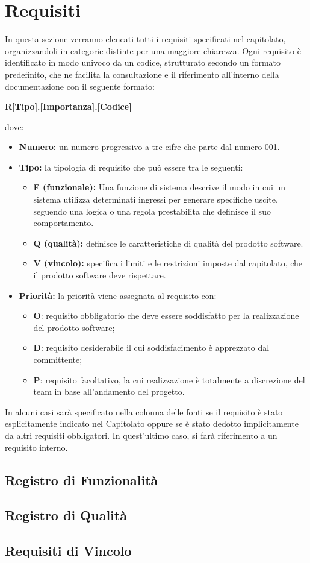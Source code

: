\section{Requisiti}
In questa sezione verranno elencati tutti i requisiti specificati nel capitolato, organizzandoli in categorie distinte per una maggiore chiarezza. Ogni requisito è identificato in modo univoco da un codice, strutturato secondo un formato predefinito, che ne facilita la consultazione e il riferimento all'interno della documentazione con il seguente formato: 
\begin{center}
\textbf{R[Tipo].[Importanza].[Codice]}
\end{center}
dove:
\begin{itemize}
    \item \textbf{Numero:} un numero progressivo a tre cifre che parte dal numero 001.
    \item \textbf{Tipo:} la tipologia di requisito che può essere tra le seguenti:
    \begin{itemize}[label=-]
        \item \textbf{F (funzionale):} Una funzione di sistema descrive il modo in cui un sistema utilizza determinati ingressi per generare specifiche uscite, seguendo una logica o una regola prestabilita che definisce il suo comportamento.
        \item \textbf{Q (qualità):} definisce le caratteristiche di qualità del prodotto software.
        \item \textbf{V (vincolo):} specifica i limiti e le restrizioni imposte dal capitolato, che il prodotto software deve rispettare.
\end{itemize}
    \item \textbf{Priorità:} la priorità viene assegnata al requisito con:
    \begin{itemize}
     \item \textbf{O}: requisito obbligatorio che deve essere soddisfatto per la realizzazione del prodotto software;
        \item \textbf{D}: requisito desiderabile il cui soddisfacimento è apprezzato dal committente;
        \item \textbf{P}: requisito facoltativo, la cui realizzazione è totalmente a discrezione del team in base all'andamento del progetto.
    \end{itemize}
\end{itemize}
In alcuni casi sarà specificato nella colonna delle fonti se il requisito è stato esplicitamente indicato nel Capitolato oppure se è stato dedotto implicitamente da altri requisiti obbligatori. In quest’ultimo caso, si farà riferimento a un requisito interno.
\subsection{Registro di Funzionalità}

\subsection{Registro di Qualità}

\subsection{Requisiti di Vincolo}
